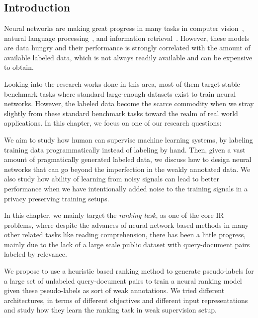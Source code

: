\chapter{}
\label{chap:4}

\section{Introduction}
Neural networks are making great progress in many tasks in computer vision~\citep{krizhevsky2012imagenet}, natural language processing~\citep{collobert2008unified}, and information retrieval~\citep{welling2005exponential}. However, these models are data hungry and their performance is strongly correlated with the amount of available labeled data, which is not always readily available and can be expensive to obtain. 

Looking into the research works done in this area, most of them target stable benchmark tasks where standard large-enough datasets exist to train neural networks. However, the labeled data become the scarce commodity when we stray slightly from these standard benchmark tasks toward the realm of real world applications. In this chapter, we focus on one of our research questions:

We aim to study how human can supervise machine learning systems, by labeling training data programmatically instead of labeling by hand. Then, given a vast amount of pragmatically generated labeled data, we discuss how to design neural networks that can go beyond the imperfection in the weakly annotated data. We also study how ability of learning from noisy signals can lead to better performance when we have intentionally added noise to the training signals in a privacy preserving training setups.

\medskip
In this chapter, we mainly target the \emph{ranking task}, as one of the core IR problems, where despite the advances of neural network based methods in many other related tasks like reading comprehension, there has been a little progress, mainly due to the lack of a large scale public dataset with query-document pairs labeled by relevance. 

We propose to use a heuristic based ranking method to generate pseudo-labels for a large set of unlabeled query-document pairs to train a neural ranking model given these pseudo-labels as sort of weak annotations.  We tried different architectures, in terms of different objectives and different input representations and study how they learn the ranking task in weak supervision setup.

